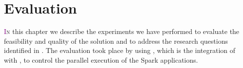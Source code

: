 \chapter{Evaluation} \label{chap:Evaluation}

\lettrine[lines=4]{\textcolor{purple}{I}}{n} this chapter we describe the experiments we have performed to evaluate the feasibility and quality of the solution and to address the research questions identified in  . The evaluation took place by using  \tool, which is the integration of \dSymb with \cSpark, to control the parallel execution of the Spark applications.

